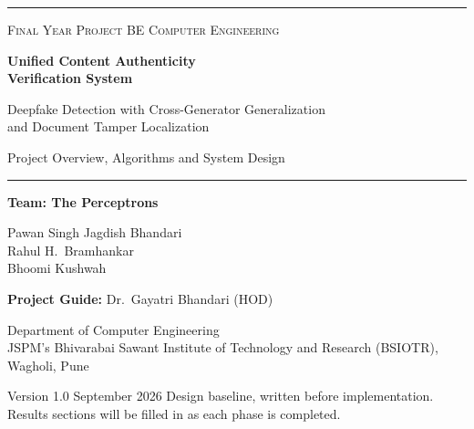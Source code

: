 \documentclass[11pt,a4paper]{article}
\begin{document}
\hypersetup{pageanchor=false}
\begin{titlepage}
\thispagestyle{empty}
\centering
{\color{cPrimary}\rule{\linewidth}{1.2pt}}\par\vspace{1.4em}
{\small\color{cAccent}\textsc{Final Year Project \quad\textbar\quad BE Computer Engineering}}\par\vspace{1.2em}
{\LARGE\bfseries Unified Content Authenticity\\[0.2em] Verification System\par}
\vspace{0.8em}
{\large Deepfake Detection with Cross-Generator Generalization\\ and Document Tamper Localization\par}
\vspace{1.2em}
{\Large\color{cPrimary} Project Overview, Algorithms and System Design\par}
\vspace{1.2em}
{\color{cPrimary}\rule{\linewidth}{1.2pt}}\par
\vfill
{\large\bfseries Team: The Perceptrons\par}
\vspace{0.6em}
Pawan Singh Jagdish Bhandari\\
Rahul H.\ Bramhankar\\
Bhoomi Kushwah\par
\vspace{1.4em}
{\bfseries Project Guide:} Dr.\ Gayatri Bhandari (HOD)\par
\vspace{1.4em}
Department of Computer Engineering\\
JSPM's Bhivarabai Sawant Institute of Technology and Research (BSIOTR), Wagholi, Pune\par
\vfill
{\small\color{cMuted} Version 1.0 \quad\textbar\quad September 2026 \quad\textbar\quad Design baseline, written before implementation.\\
Results sections will be filled in as each phase is completed.\par}
\end{titlepage}
\hypersetup{pageanchor=true}

\tableofcontents
\clearpage
\listoffigures
\listofalgorithms
\clearpage
\end{document}
